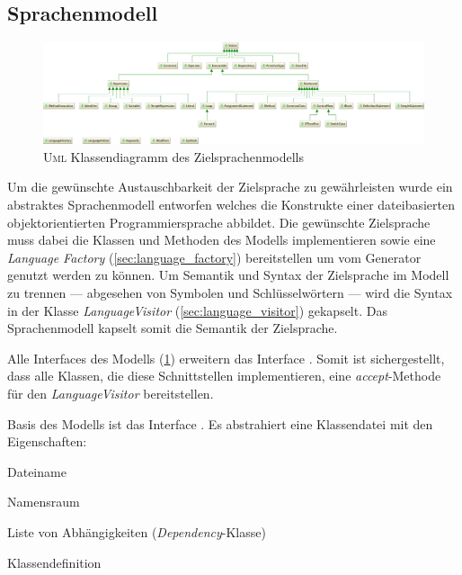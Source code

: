 \subsection{Sprachenmodell}
\label{sec:language_model}

\begin{figure}
    \centering
    \includegraphics[width=\textheight]{resources/languagemodel_common}
    \caption{\textsc{Uml} Klassendiagramm des Zielsprachenmodells}
    \label{fig:language_model}
\end{figure}

Um die gewünschte Austauschbarkeit der Zielsprache zu gewährleisten wurde ein abstraktes Sprachenmodell entworfen welches die Konstrukte einer dateibasierten objektorientierten Programmiersprache abbildet. 
Die gewünschte Zielsprache muss dabei die Klassen und Methoden des Modells implementieren sowie eine \emph{Language Factory} (\cref{sec:language_factory}) bereitstellen um vom Generator genutzt werden zu können.
Um Semantik und Syntax der Zielsprache im Modell zu trennen --- abgesehen von Symbolen und Schlüsselwörtern --- wird die Syntax in der Klasse \emph{LanguageVisitor} (\cref{sec:language_visitor}) gekapselt. Das Sprachenmodell kapselt somit die Semantik der Zielsprache.

Alle Interfaces des Modells (\cref{fig:language_model}) erweitern das Interface . Somit ist sichergestellt, dass alle Klassen, die diese Schnittstellen implementieren, eine \emph{accept}-Methode für den \emph{LanguageVisitor} bereitstellen.

Basis des Modells ist das Interface . Es abstrahiert eine Klassendatei mit den Eigenschaften:
\begin{compactitem}
    \item Dateiname
    \item Namensraum
    \item Liste von Abhängigkeiten (\emph{Dependency}-Klasse)
    \item Klassendefinition
\end{compactitem}

